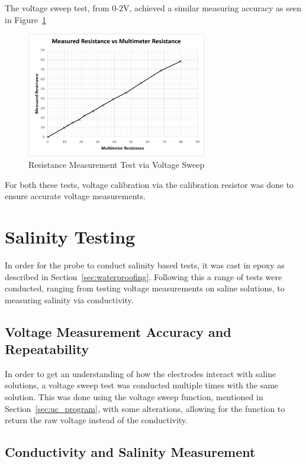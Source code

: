 The voltage sweep test, from 0-2V, achieved a similar measuring accuracy as seen in Figure~\ref{fig:resistance_measurement_test}
\begin{figure}[H]\label{fig:resistance_measurement_test}
    \centering
    \includegraphics[width=0.7\textwidth]{figures/resistance_measurement_test.png}
    \caption{Resistance Measurement Test via Voltage Sweep}
\end{figure}

For both these tests, voltage calibration via the calibration resistor was done to ensure accurate voltage measurements.

\section{Salinity Testing}
In order for the probe to conduct salinity based tests, it was cast in epoxy as described in Section~\ref{sec:waterproofing}.
Following this a range of tests were conducted, ranging from testing voltage measurements on saline solutions, to measuring salinity via conductivity.

\subsection{Voltage Measurement Accuracy and Repeatability}
In order to get an understanding of how the electrodes interact with saline solutions, a voltage sweep test was conducted multiple times with the same solution.
This was done using the voltage sweep function, mentioned in Section~\ref{sec:uc_program}, with some alterations, allowing for the function to return the raw voltage instead of the conductivity.



\subsection{Conductivity and Salinity Measurement}

